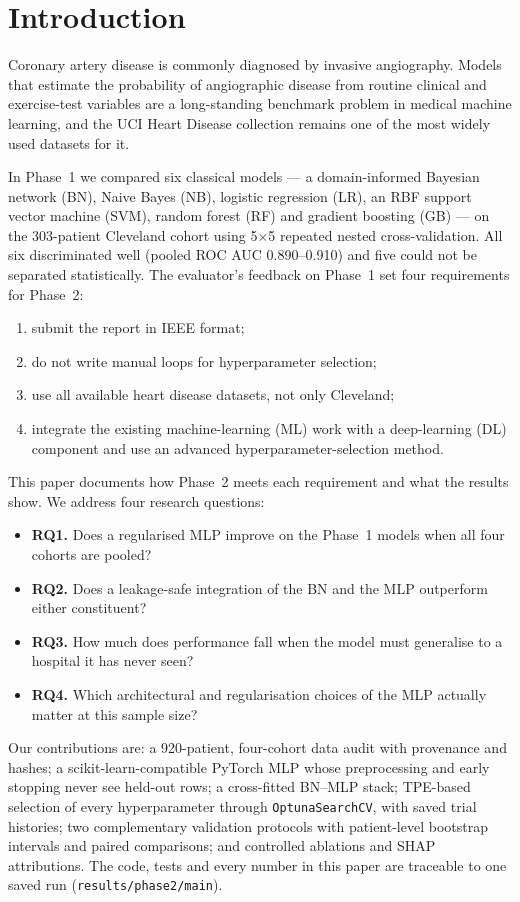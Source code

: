 \documentclass[conference]{IEEEtran}
\newcommand{\code}[1]{\texttt{\small #1}}
\begin{document}
\section{Introduction}
Coronary artery disease is commonly diagnosed by invasive angiography. Models that estimate the probability of angiographic disease from routine clinical and exercise-test variables are a long-standing benchmark problem in medical machine learning, and the UCI Heart Disease collection \cite{uci,detrano} remains one of the most widely used datasets for it.

In Phase~1 we compared six classical models --- a domain-informed Bayesian network (BN), Naive Bayes (NB), logistic regression (LR), an RBF support vector machine (SVM), random forest (RF) and gradient boosting (GB) --- on the 303-patient Cleveland cohort using 5$\times$5 repeated nested cross-validation. All six discriminated well (pooled ROC AUC 0.890--0.910) and five could not be separated statistically. The evaluator's feedback on Phase~1 set four requirements for Phase~2:
\begin{enumerate}
\item submit the report in IEEE format;
\item do not write manual loops for hyperparameter selection;
\item use all available heart disease datasets, not only Cleveland;
\item integrate the existing machine-learning (ML) work with a deep-learning (DL) component and use an advanced hyperparameter-selection method.
\end{enumerate}
This paper documents how Phase~2 meets each requirement and what the results show. We address four research questions:
\begin{itemize}
\item \textbf{RQ1.} Does a regularised MLP improve on the Phase~1 models when all four cohorts are pooled?
\item \textbf{RQ2.} Does a leakage-safe integration of the BN and the MLP outperform either constituent?
\item \textbf{RQ3.} How much does performance fall when the model must generalise to a hospital it has never seen?
\item \textbf{RQ4.} Which architectural and regularisation choices of the MLP actually matter at this sample size?
\end{itemize}
Our contributions are: a 920-patient, four-cohort data audit with provenance and hashes; a scikit-learn-compatible PyTorch MLP whose preprocessing and early stopping never see held-out rows; a cross-fitted BN--MLP stack; TPE-based selection of every hyperparameter through \code{OptunaSearchCV}, with saved trial histories; two complementary validation protocols with patient-level bootstrap intervals and paired comparisons; and controlled ablations and SHAP attributions. The code, tests and every number in this paper are traceable to one saved run (\code{results/phase2/main}).
\end{document}
